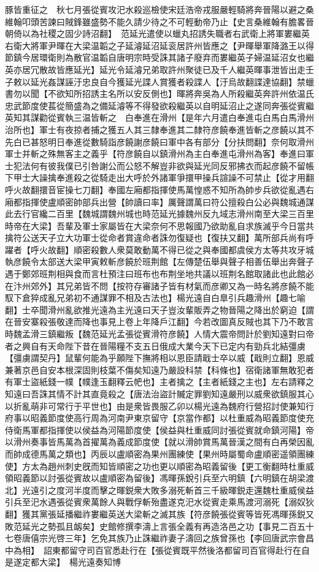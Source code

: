 豚皆重征之　秋七月張從賓攻汜水殺巡檢使宋廷浩帝戎服嚴輕騎將奔晉陽以避之桑維翰叩頭苦諫曰賊鋒雖盛勢不能久請少待之不可輕動帝乃止【史言桑維翰有膽畧晉朝倚以為社稷之固少詩沼翻】　范延光遣使以蠟丸招誘失職者右武衛上將軍婁繼英右衛大將軍尹暉在大梁温韜之子延濬延沼延衮居許州皆應之【尹暉舉軍降潞王以得節鎮今居環衛則為散官温韜自唐明宗時受誅其諸子廢弃而婁繼英子婦温延沼女也繼英亦居冗散故皆應延光】延光令延濬兄弟取許州聚徒已及千人繼英暉事泄皆出走壬子敕以延光姦謀誣汙忠良自今獲延光諜人賞獲者殺諜人【汙烏故翻諜達協翻】禁蠟書勿以聞【不欲知所招誘主名所以安反側也】暉將奔吳為人所殺繼英奔許州依温氏忠武節度使萇從簡盛為之備延濬等不得發欲殺繼英以自明延沼止之遂同奔張從賓繼英知其謀勸從賓執三温皆斬之　白奉進在滑州【是年六月遣白奉進屯白馬白馬滑州治所也】軍士有夜掠者捕之獲五人其三隸奉進其二隸符彦饒奉進皆斬之彦饒以其不先白已甚怒明日奉進從數騎詣彦饒謝彦饒曰軍中各有部分【分扶問翻】奈何取滑州軍士并斬之殊無客主之義乎【符彦饒自以鎮滑州為主白奉進屯滑州為客】奉進曰軍士犯法何有彼我僕已引咎謝公而公怒不解豈非欲與延光同反邪拂衣而起彦饒不留帳下甲士大譟擒奉進殺之從騎走出大呼於外諸軍爭擐甲操兵諠譟不可禁止【從才用翻呼火故翻擐音宦操七刀翻】奉國左廂都指揮使馬萬惶惑不知所為帥步兵欲從亂遇右廂都指揮使盧順密帥部兵出營【帥讀曰率】厲聲謂萬曰符公擅殺白公必與魏城通謀此去行官纔二百里【魏城謂魏州城也時范延光據魏州反九域志滑州南至大梁三百里時帝在大梁】吾輩及軍士家屬皆在大梁奈何不思報國乃欲助亂自求族滅乎今日當共擒符公送天子立大功軍士從命者賞違命者誅勿復疑也【復扶又翻】萬所部兵尚有呼躍者【呼火故翻】順密殺數人衆莫敢動萬不得已從之與奉國都虞侯方太等共攻牙城執彦饒令太部送大梁甲寅敕斬彦饒於班荆館【左傳楚伍舉與聲子相善伍舉出奔聲子遇于鄭郊班荆相與食而言杜預注曰班布也布荆坐地共議以班荆名館取諸此也此館必在汴州郊外】其兄弟皆不問【按符存審諸子皆有材氣而彦卿又為一時名將彦饒不能馭下倉猝成亂兄弟初不通謀罪不相及古法也】楊光遠自白臯引兵趣滑州【趣七喻翻】士卒聞滑州亂欲推光遠為主光遠曰天子豈汝輩販弄之物晉陽之降出於窮迫【謂在晉安寨殺張敬達而降也事見上卷上年降戶江翻】今若改圖真反賊也其下乃不敢言時魏孟滑三鎮繼叛【魏范延光孟張從賓滑符彦饒】人情大震帝問計於劉知遠對曰帝者之興自有天命陛下昔在晉陽糧不支五日俄成大業今天下已定内有勁兵北結彊虜【彊虜謂契丹】鼠輩何能為乎願陛下撫將相以恩臣請戢士卒以威【戢則立翻】恩威兼著京邑自安本根深固則枝葉不傷矣知遠乃嚴設科禁【科條也】宿衛諸軍無敢犯者有軍士盜紙錢一幞【幞逢玉翻釋云帊也】主者擒之【主者紙錢之主也】左右請釋之知遠曰吾誅其情不計其直竟殺之【唐法治盜計贓定罪劉知遠嚴刑以威衆欲鎮服其心以折亂萌非可常行于平世也】由是衆皆畏服乙卯以楊光遠為魏府行營招討使兼知行府事以昭義節度使高行周為河南尹東京留守【京當作都】以杜重威為昭義節度使充侍衛馬軍都指揮使以侯益為河陽節度使【侯益與杜重威同討張從賓就命鎮河陽】帝以滑州奏事皆馬萬為首擢萬為義成節度使【就以滑帥賞馬萬晉漢之間有白再榮因亂而帥成德馬萬之類也】丙辰以盧順密為果州團練使【果州時屬蜀命盧順密遥領團練使】方太為趙州刺史旣而知皆順密之功也更以順密為昭義留後【更工衡翻時杜重威領昭義節以討張從賓故以盧順密為留後】馮暉孫銳引兵至六明鎮【六明鎮在胡梁渡北】光遠引之度河半度而擊之暉鋭衆大敗多溺死斬首三千級暉鋭走還魏杜重威侯益引兵至汜水遇張從賓衆萬餘人與戰俘斬殆盡遂克汜水從賓走乘馬渡河溺死【溺奴狄翻】獲其黨張延播繼祚婁繼英送大梁斬之滅其族【符彦饒張從賓等皆死馮暉孫鋭又敗范延光之勢孤且衂矣】史館修撰李濤上言張全義有再造洛邑之功【事見二百五十七卷唐僖宗光啓三年】乞免其族乃止誅繼祚妻子濤回之族曾孫也【李回唐武宗會昌中為相】　詔東都留守司百官悉赴行在【張從賓既平然後洛都留司百官得赴行在自是遂定都大梁】　楊光遠奏知博